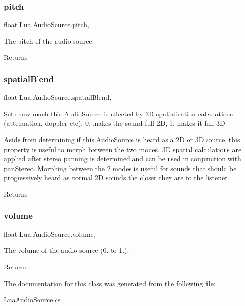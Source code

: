 \subsubsection{\texorpdfstring{pitch}{pitch}}
{\footnotesize\ttfamily float Lua.\+Audio\+Source.\+pitch\hspace{0.3cm}{\ttfamily [get]}, {\ttfamily [set]}}



The pitch of the audio source. 

\begin{DoxyReturn}{Returns}

\end{DoxyReturn}
\mbox{\label{class_lua_1_1_audio_source_a88e74fc4c2c4cf17747d6bbdad516a8f}} 
\subsubsection{\texorpdfstring{spatialBlend}{spatialBlend}}
{\footnotesize\ttfamily float Lua.\+Audio\+Source.\+spatial\+Blend\hspace{0.3cm}{\ttfamily [get]}, {\ttfamily [set]}}



Sets how much this \mbox{\hyperlink{class_lua_1_1_audio_source}{Audio\+Source}} is affected by 3D spatialisation calculations (attenuation, doppler etc). 0. makes the sound full 2D, 1. makes it full 3D. 

Aside from determining if this \mbox{\hyperlink{class_lua_1_1_audio_source}{Audio\+Source}} is heard as a 2D or 3D source, this property is useful to morph between the two modes. 3D spatial calculations are applied after stereo panning is determined and can be used in conjunction with pan\+Stereo. Morphing between the 2 modes is useful for sounds that should be progressively heard as normal 2D sounds the closer they are to the listener. \begin{DoxyReturn}{Returns}

\end{DoxyReturn}
\mbox{\label{class_lua_1_1_audio_source_a6e631df6c296491e5a29c8025878ddb4}} 
\subsubsection{\texorpdfstring{volume}{volume}}
{\footnotesize\ttfamily float Lua.\+Audio\+Source.\+volume\hspace{0.3cm}{\ttfamily [get]}, {\ttfamily [set]}}



The volume of the audio source (0. to 1.). 

\begin{DoxyReturn}{Returns}

\end{DoxyReturn}


The documentation for this class was generated from the following file\+:\begin{DoxyCompactItemize}
\item 
Lua\+Audio\+Source.\+cs\end{DoxyCompactItemize}
